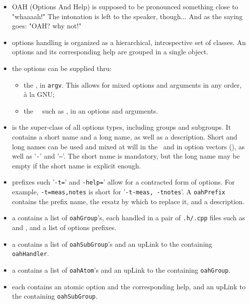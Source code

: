 \begin{itemize}
\item OAH (Options And Help) is supposed to be pronounced something close to "whaaaah!"
    The intonation is left to the speaker, though...
    And as the saying goes: "OAH? why not!"

\item options handling is organized as a hierarchical, introspective set of classes.
    An options and its corresponding help are grouped in a single object.

\item the options can be supplied thru:

\begin{itemize}
    \item the \CLI, in {\tt argv}.
        This allows for mixed options and arguments in any order, à la GNU;
    \item the \API\ \functions\ such as , in an options and arguments.
  \end{itemize}

\item {} is the super-class of all options types, including groups and subgroups.
    It contains a short name and a long name, as well as a description.
    Short and long names can be used and mixed at will in the \CLI\
    and in option vectors (\API),
    as well as '{\tt -}' and '{\tt --}'.
    The short name is mandatory, but the long name may be empty
    if the short name is explicit enough.

\item prefixes such '{\tt -t=}' and {\tt -help=}' allow for a contracted form of options.
    For example, {\tt -t=meas,notes} is short for '{\tt -t-meas, -tnotes}'.
    A {\tt oahPrefix} contains the prefix name, the ersatz by which to replace it,
    and a description.

\item a  contains a list of {\tt oahGroup}'s, each handled
    in a pair of {\tt .h/.cpp} files such as \msr{msrOah.h} and ,
    and a list of options prefixes.

\item a  contains a list of {\tt oahSubGroup}'s
    and an upLink to the containing {\tt oahHandler}.

\item a  contains a list of {\tt oahAtom}'s
    and an upLink to the containing {\tt oahGroup}.

\item each  contains an atomic option and the corresponding help,
    and an upLink to the containing {\tt oahSubGroup}.

\end{itemize}


